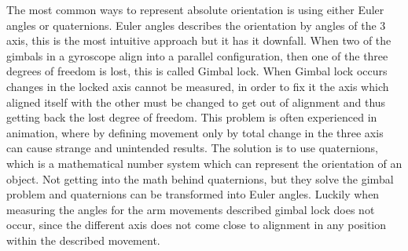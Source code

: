 The most common ways to represent absolute orientation is using either Euler angles\cite{euler} or quaternions\cite{quat}. Euler angles describes the orientation by angles of the 3 axis, this is the most intuitive approach but it has it downfall. When two of the gimbals in a gyroscope align into a parallel configuration, then one of the three degrees of freedom is lost, this is called Gimbal lock\cite{gimbal}. When Gimbal lock occurs changes in the locked axis cannot be measured, in order to fix it the axis which aligned itself with the other must be changed to get out of alignment and thus getting back the lost degree of freedom. This problem is often experienced in animation, where by defining movement only by total change in the three axis can cause strange and unintended results. The solution is to use quaternions, which is a mathematical number system which can represent the orientation of an object. Not getting into the math behind quaternions, but they solve the gimbal problem and quaternions can be transformed into Euler angles. Luckily when measuring the angles for the arm movements described gimbal lock does not occur, since the different axis does not come close to alignment in any position within the described movement. 